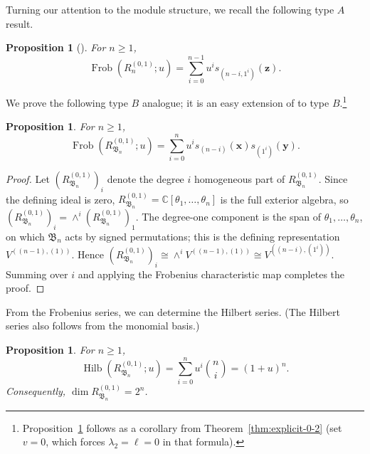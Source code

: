 \documentclass[12pt]{amsart}
\theoremstyle{plain}
\newtheorem{proposition}[theorem]{Proposition}
\theoremstyle{definition}
\DeclareMathOperator{\Frob}{Frob}
\DeclareMathOperator{\Hilb}{Hilb}
\newcommand{\C}{\mathbb{C}}
\newcommand{\x}{\mathbf{x}}
\newcommand{\y}{\mathbf{y}}
\newcommand{\z}{\mathbf{z}}
\begin{document}
Turning our attention to the module structure, we recall the following type $A$ result.
\begin{proposition}[\cite{HaglundSergel}]\label{prop:HS-one-set}
For $n \geq 1$,
        \begin{equation}
        \Frob(R_n^{(0,1)}; u) = \sum_{i=0}^{n-1} u^i s_{(n-i,1^i)}(\z).
    \end{equation}
\end{proposition}

We prove the following type $B$ analogue; it is an easy extension of \cite[Lemma 4.10]{HaglundSergel} to type $B$.\footnote{Proposition~\ref{prop:one-set} follows as a corollary from Theorem~\ref{thm:explicit-0-2} (set $v=0$, which forces $\lambda_2 = \ell = 0$ in that formula).}
\begin{proposition}\label{prop:one-set}
For $n \geq 1$,
    \begin{equation}
        \Frob(R_{\mathfrak{B}_n}^{(0,1)}; u) = \sum_{i=0}^{n} u^i s_{(n-i)}(\x)s_{(1^i)}(\y).
    \end{equation}
\end{proposition}

\begin{proof}
Let $(R_{\mathfrak{B}_n}^{(0,1)})_{i}$ denote the degree $i$ homogeneous part of $R_{\mathfrak{B}_n}^{(0,1)}$. 
Since the defining ideal is zero, $R_{\mathfrak{B}_n}^{(0,1)} = \C[\theta_1,\ldots,\theta_n]$ is the full exterior algebra, so $(R_{\mathfrak{B}_n}^{(0,1)})_{i} = \wedge^i (R_{\mathfrak{B}_n}^{(0,1)})_{1}$.
The degree-one component is the span of $\theta_1, \ldots, \theta_n$, on which $\mathfrak{B}_n$ acts by signed permutations; this is the defining representation $V^{((n-1),(1))}$. 
Hence $(R_{\mathfrak{B}_n}^{(0,1)})_{i} \cong \wedge^i V^{((n-1),(1))} \cong V^{((n-i),(1^i))}$.
Summing over $i$ and applying the Frobenius characteristic map completes the proof.
\end{proof}

From the Frobenius series, we can determine the Hilbert series. 
(The Hilbert series also follows from the monomial basis.)

\begin{proposition}\label{prop:01-B_n-Hilb}
For $n \geq 1$,
        \begin{equation}
        \Hilb(R_{\mathfrak{B}_n}^{(0,1)}; u) = \sum_{i=0}^{n} u^i\binom{n}{i} = (1+u)^n.
    \end{equation}
Consequently, $\dim R_{\mathfrak{B}_n}^{(0,1)} = 2^n$.
\end{proposition}
\end{document}
